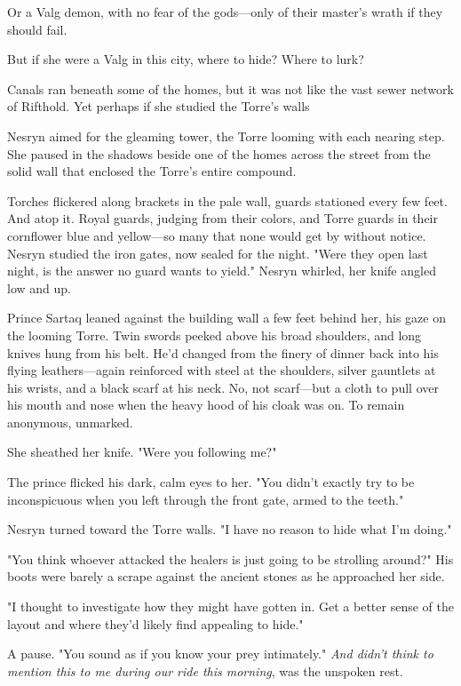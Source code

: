 Or a Valg demon, with no fear of the gods---only of their master's wrath if they should fail.

But if she were a Valg in this city, where to hide? Where to lurk?

Canals ran beneath some of the homes, but it was not like the vast sewer network of Rifthold. Yet perhaps if she studied the Torre's walls


Nesryn aimed for the gleaming tower, the Torre looming with each nearing step. She paused in the shadows beside one of the homes across the street from the solid wall that enclosed the Torre's entire compound.

Torches flickered along brackets in the pale wall, guards stationed every few feet. And atop it. Royal guards, judging from their colors, and Torre guards in their cornflower blue and yellow---so many that none would get by without notice. Nesryn studied the iron gates, now sealed for the night. "Were they open last night, is the answer no guard wants to yield." Nesryn whirled, her knife angled low and up.

Prince Sartaq leaned against the building wall a few feet behind her, his gaze on the looming Torre. Twin swords peeked above his broad shoulders, and long knives hung from his belt. He'd changed from the finery of dinner back into his flying leathers---again reinforced with steel at the shoulders, silver gauntlets at his wrists, and a black scarf at his neck. No, not scarf---but a cloth to pull over his mouth and nose when the heavy hood of his cloak was on. To remain anonymous, unmarked.

She sheathed her knife. "Were you following me?"

The prince flicked his dark, calm eyes to her. "You didn't exactly try to be inconspicuous when you left through the front gate, armed to the teeth."

Nesryn turned toward the Torre walls. "I have no reason to hide what I'm doing."

"You think whoever attacked the healers is just going to be strolling around?" His boots were barely a scrape against the ancient stones as he approached her side.

"I thought to investigate how they might have gotten in. Get a better sense of the layout and where they'd likely find appealing to hide."

A pause. "You sound as if you know your prey intimately." \emph{And didn't think to mention this to me during our ride this morning}, was the unspoken rest.

